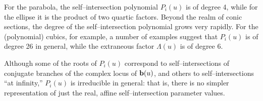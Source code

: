 \begin{exmpl}
\label{exmpl:trimellps}
{\rm
For the parabola,
the self--intersection polynomial
$P_i(u)$ is of degree 4, while for the ellipse it is 
the product of two quartic factors.
Beyond the realm of conic sections, the degree of the self--intersection
polynomial grows very rapidly. For the (polynomial) cubics, for example,
a number of examples suggest that $P_i(u)$ is of degree 26 in general,
while the extraneous factor $\Lambda(u)$ is of degree 6. 
} \QED
\end{exmpl}

Although some of the roots of
$P_i(u)$ correspond to self--intersections of conjugate branches of the
complex locus of ${\bf b}(u)$, and others to self--intersections ``at
infinity,'' $P_i(u)$ is irreducible in general: that is, there
is no simpler representation of just the real, affine self--intersection
parameter values.



